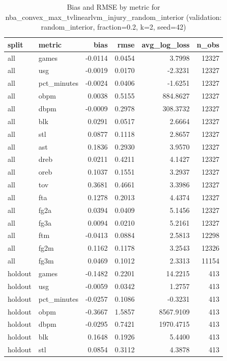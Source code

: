 \begin{table}
\caption{Bias and RMSE by metric for nba_convex_max_tvlinearlvm_injury_random_interior (validation: random_interior, fraction=0.2, k=2, seed=42)}
\label{tab:nba_convex_max_tvlinearlvm_injury_random_interior_vs_random_interior_f20_k2_s42_bias_rmse}
\begin{tabular}{llrrrr}
\toprule
split & metric & bias & rmse & avg\_log\_loss & n\_obs \\
\midrule
all & games & -0.0114 & 0.0454 & 3.7998 & 12327 \\
all & usg & -0.0019 & 0.0170 & -2.3231 & 12327 \\
all & pct\_minutes & -0.0024 & 0.0406 & -1.6251 & 12327 \\
all & obpm & 0.0038 & 0.5155 & 884.8627 & 12327 \\
all & dbpm & -0.0009 & 0.2978 & 308.3732 & 12327 \\
all & blk & 0.0291 & 0.0517 & 2.6664 & 12327 \\
all & stl & 0.0877 & 0.1118 & 2.8657 & 12327 \\
all & ast & 0.1836 & 0.2930 & 3.9570 & 12327 \\
all & dreb & 0.0211 & 0.4211 & 4.1427 & 12327 \\
all & oreb & 0.1037 & 0.1551 & 3.2937 & 12327 \\
all & tov & 0.3681 & 0.4661 & 3.3986 & 12327 \\
all & fta & 0.1278 & 0.2013 & 4.4374 & 12327 \\
all & fg2a & 0.0394 & 0.0409 & 5.1456 & 12327 \\
all & fg3a & 0.0094 & 0.0210 & 5.2161 & 12327 \\
all & ftm & -0.0413 & 0.0884 & 2.5813 & 12298 \\
all & fg2m & 0.1162 & 0.1178 & 3.2543 & 12326 \\
all & fg3m & 0.0469 & 0.1012 & 2.3313 & 11154 \\
holdout & games & -0.1482 & 0.2201 & 14.2215 & 413 \\
holdout & usg & -0.0059 & 0.0342 & 1.2757 & 413 \\
holdout & pct\_minutes & -0.0257 & 0.1086 & -0.3231 & 413 \\
holdout & obpm & -0.3667 & 1.5857 & 8567.9109 & 413 \\
holdout & dbpm & -0.0295 & 0.7421 & 1970.4715 & 413 \\
holdout & blk & 0.1648 & 0.1926 & 5.4400 & 413 \\
holdout & stl & 0.0854 & 0.3112 & 4.3878 & 413 \\

\end{tabular}
\end{table}
